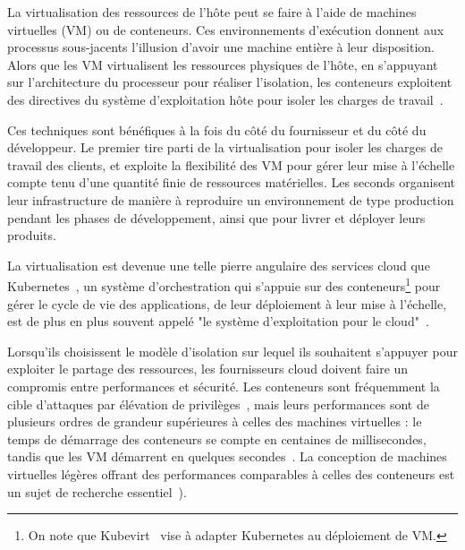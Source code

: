 La virtualisation des ressources de l'hôte peut se faire à l'aide de machines virtuelles (VM) ou de conteneurs. Ces environnements d'exécution donnent aux processus sous-jacents l'illusion d'avoir une machine entière à leur disposition. Alors que les VM virtualisent les ressources physiques de l'hôte, en s'appuyant sur l'architecture du processeur pour réaliser l'isolation, les conteneurs exploitent des directives du système d'exploitation hôte pour isoler les charges de travail~\cite{mancoMyVMLighter2017}.

Ces techniques sont bénéfiques à la fois du côté du fournisseur et du côté du développeur. Le premier tire parti de la virtualisation pour isoler les charges de travail des clients, et exploite la flexibilité des VM pour gérer leur mise à l'échelle compte tenu d'une quantité finie de ressources matérielles. Les seconds organisent leur infrastructure de manière à reproduire un environnement de type production pendant les phases de développement, ainsi que pour livrer et déployer leurs produits.

La virtualisation est devenue une telle pierre angulaire des services cloud que Kubernetes~\cite{kubernetes}, un système d'orchestration qui s'appuie sur des conteneurs\footnote{On note que Kubevirt~\cite{kubevirt} vise à adapter Kubernetes au déploiement de VM.} pour gérer le cycle de vie des applications, de leur déploiement à leur mise à l'échelle, est de plus en plus souvent appelé "le système d'exploitation pour le cloud"~\cite{jonreeve2018kubernetes}.

Lorsqu'ils choisissent le modèle d'isolation sur lequel ils souhaitent s'appuyer pour exploiter le partage des ressources, les fournisseurs cloud doivent faire un compromis entre performances et sécurité. Les conteneurs sont fréquemment la cible d'attaques par élévation de privilèges~\cite{zomer2022containers, redhat2019containers}, mais leurs performances sont de plusieurs ordres de grandeur supérieures à celles des machines virtuelles : le temps de démarrage des conteneurs se compte en centaines de millisecondes, tandis que les VM démarrent en quelques secondes~\cite{mancoMyVMLighter2017}. La conception de machines virtuelles légères offrant des performances comparables à celles des conteneurs est un sujet de recherche essentiel~\cite{agacheFirecrackerLightweightVirtualization, Anjali2020BlendingCA}).

